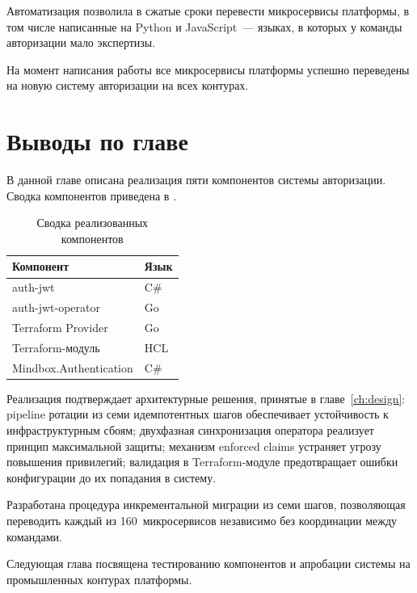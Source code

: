 Автоматизация позволила в сжатые сроки перевести
микросервисы платформы,
в том числе написанные на Python и JavaScript~---
языках, в которых у команды авторизации мало экспертизы.

На момент написания работы все микросервисы платформы
успешно переведены на новую систему авторизации на всех контурах.

\section{Выводы по главе}\label{sec:ch3-conclusion}

В данной главе описана реализация пяти компонентов
системы авторизации.
Сводка компонентов приведена в .

\begin{table}[h]
  \centering
  \caption{Сводка реализованных компонентов}
  \label{tab:components-summary}
  \begin{tabularx}{\textwidth}{X l}
    \hline
    \textbf{Компонент} & \textbf{Язык} \\
    \hline
    auth-jwt              & C\# \\
    auth-jwt-operator     & Go  \\
    Terraform Provider    & Go  \\
    Terraform-модуль      & HCL \\
    Mindbox.Authentication & C\# \\
    \hline
  \end{tabularx}
\end{table}

Реализация подтверждает архитектурные решения, принятые в главе~\ref{ch:design}:
pipeline ротации из семи идемпотентных шагов
обеспечивает устойчивость к инфраструктурным сбоям;
двухфазная синхронизация оператора реализует принцип максимальной защиты;
механизм enforced claims устраняет угрозу повышения привилегий;
валидация в Terraform-модуле предотвращает ошибки конфигурации
до их попадания в систему.

Разработана процедура инкрементальной миграции из семи шагов,
позволяющая переводить каждый из 160~микросервисов независимо
без координации между командами.

Следующая глава посвящена тестированию компонентов
и апробации системы на промышленных контурах платформы.

\FloatBarrier
